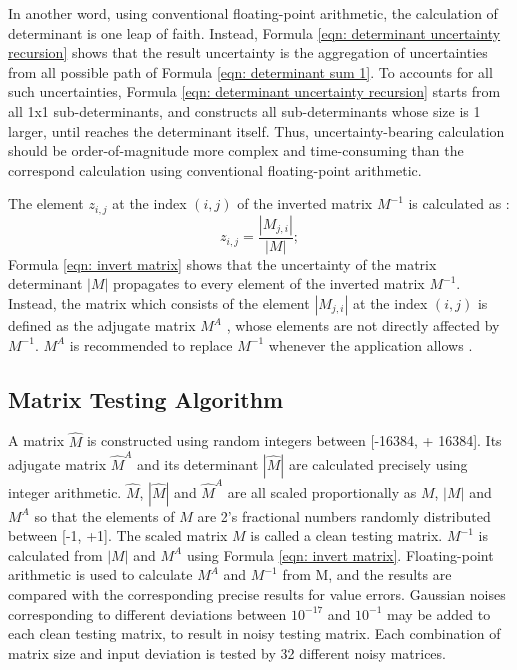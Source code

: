 \documentclass[twoside]{article}
\numberwithin{equation}{section}
\begin{document}
In another word, using conventional floating-point arithmetic, the calculation of determinant is one leap of faith. Instead, Formula \eqref{eqn: determinant uncertainty recursion} shows that the result uncertainty is the aggregation of uncertainties from all possible path of Formula \eqref{eqn: determinant sum 1}.  To accounts for all such uncertainties, Formula \eqref{eqn: determinant uncertainty recursion} starts from all 1x1 sub-determinants, and constructs all sub-determinants whose size is 1 larger, until reaches the determinant itself.  Thus, uncertainty-bearing calculation should be order-of-magnitude more complex and time-consuming than the correspond calculation using conventional floating-point arithmetic.

The element $z_{i,j}$ at the index $(i,j)$ of the inverted matrix $M^{-1}$ is calculated as \cite{Linear_Algebra}:
\begin{equation}
\label{eqn: invert matrix}
z_{i,j} = \frac{|M_{j,i}|}{|M|};
\end{equation}
Formula \eqref{eqn: invert matrix} shows that the uncertainty of the matrix determinant $|M|$  propagates to every element of the inverted matrix $M^{-1}$.  Instead, the matrix which consists of the element $|M_{j,i}|$ at the index $(i, j)$ is defined as the adjugate matrix $M^{A}$ \cite{Linear_Algebra}, whose elements are not directly affected by $M^{-1}$.  $M^{A}$ is recommended to replace $M^{-1}$ whenever the application allows \cite{Numerical_Recipes}. 

\subsection{Matrix Testing Algorithm}

A matrix $\widehat{M}$ is constructed using random integers between [-16384, + 16384].  Its adjugate matrix $\widehat{M}^{A}$ and its determinant $|\widehat{M}|$ are calculated precisely using integer arithmetic.  $\widehat{M}$, $|\widehat{M}|$ and $\widehat{M}^{A}$ are all scaled proportionally as \textbf{$M$}, \textbf{$|M|$} and \textbf{$M^{A}$} so that the elements of \textbf{$M$} are 2's fractional numbers randomly distributed between [-1, +1].  The scaled matrix \textbf{$M$} is called a clean testing matrix.  \textbf{$M^{-1}$} is calculated from \textbf{$|M|$} and \textbf{$M^{A}$} using Formula \eqref{eqn: invert matrix}.  Floating-point arithmetic is used to calculate $M^{A}$ and $M^{-1}$ from M, and the results are compared with the corresponding precise results for value errors.  Gaussian noises corresponding to different deviations between $10^{-17}$ and $10^{-1}$ may be added to each clean testing matrix, to result in noisy testing matrix.  Each combination of matrix size and input deviation is tested by 32 different noisy matrices.  
\end{document}
